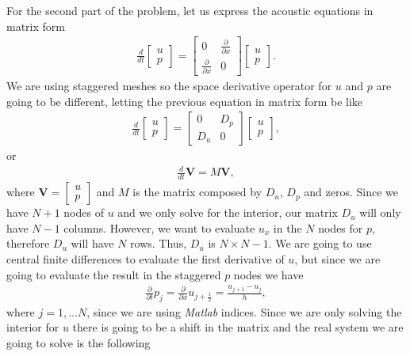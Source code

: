 For the second part of the problem, let us express the acoustic equations in matrix form
\begin{align*}
\frac{d}{dt}\begin{bmatrix} u \\ p \end{bmatrix}=\begin{bmatrix} 0 & \frac{\partial}{\partial x}\\ \frac{\partial}{\partial x} & 0\end{bmatrix}\begin{bmatrix} u \\ p \end{bmatrix}.
\end{align*}
We are using staggered meshes so the space derivative operator for $u$ and $p$ are going to be different, letting the previous equation in matrix form be like
\begin{align*}
\frac{d}{dt}\begin{bmatrix} u \\ p \end{bmatrix}=\begin{bmatrix} 0 & D_p\\ D_u & 0\end{bmatrix}\begin{bmatrix} u \\ p \end{bmatrix},
\end{align*}
or
\begin{align*}
\frac{d}{dt}\textbf{V}=M\textbf{V},
\end{align*}
where $\textbf{V}=\begin{bmatrix} u \\ p \end{bmatrix}$ and $M$ is the matrix composed by $D_u$, $D_p$ and zeros. Since we have $N+1$ nodes of $u$ and we only solve for the interior, our matrix  $D_u$ will only have $N-1$ columns. However, we want to evaluate $u_x$ in the $N$ nodes for $p$, therefore $D_u$ will have $N$ rows. Thus, $D_u$ is $N\times N-1$. We are going to use central finite differences to evaluate the first derivative of $u$, but since we are going to evaluate the result in the staggered $p$ nodes we have
\begin{align*}
\frac{\partial}{\partial t}p_j=\frac{\partial}{\partial x}u_{j+\frac{1}{2}}=\frac{u_{j+1}-u_{j}}{h},
\end{align*}
where $j=1,...N$, since we are using \textsl{Matlab} indices. Since we are only solving the interior for $u$ there is going to be a shift in the matrix and the real system we are going to solve is the following
